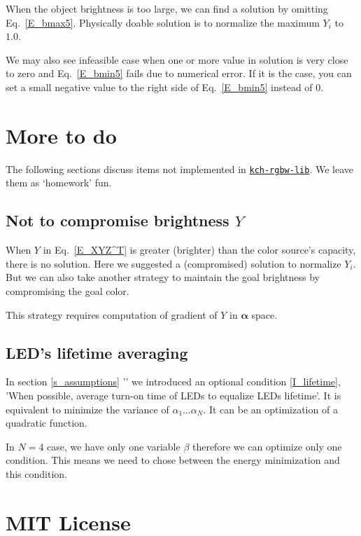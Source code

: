 \documentclass[dvipdfmx,uplatex,a4paper]{article}
\begin{document}
When the object brightness is too large, we can find a solution by omitting Eq.~\eqref{E_bmax5}. Physically doable solution is to normalize the maximum $Y_i$ to $1.0$.

We may also see infeasible case when one or more value in solution is very close to zero and Eq.~\eqref{E_bmin5} fails due to numerical error. If it is the case, you can set a small negative value to the right side of Eq.~\eqref{E_bmin5} instead of $0$.



\section{More to do}

The following sections discuss items not implemented in \href{https://www.npmjs.com/package/kch-rgbw-lib}{\texttt{kch-rgbw-lib}}. We leave them as `homework' fun.

\subsection{Not to compromise brightness $Y$}
When $Y$ in Eq.~\eqref{E_XYZ^T} is greater (brighter) than the color source's capacity, there is no solution. Here we suggested a (compromised) solution to normalize $Y_i$. But we can also take another strategy to maintain the goal brightness by compromising the goal color.

This strategy requires computation of gradient of $Y$ in $\boldsymbol{\alpha}$ space.


\subsection{LED's lifetime averaging}
In section \ref{s_assumptions} '' we introduced an optional condition \ref{I_lifetime}, 'When possible, average turn-on time of LEDs to equalize LEDs lifetime'. It is equivalent to minimize the variance of $\alpha_1 \ldots \alpha_N$. It can be an optimization of a quadratic function.

In $N = 4$ case, we have only one variable $\beta$ therefore we can optimize only one condition. This means we need to chose between the energy minimization and this condition.






\section*{MIT License}
\end{document}
